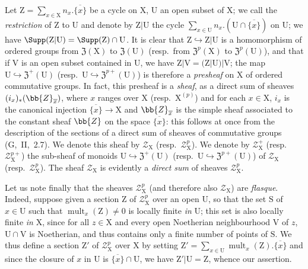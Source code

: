 \begin{env}[21.6.3]
\label{IV.21.6.3}
Let $\mathrm{Z}=\sum_{x\in\mathrm{X}}n_x.\overline{\{x\}}$ be a cycle on $\mathrm{X}$, $\mathrm{U}$ an open subset of $\mathrm{X}$;
we call the \emph{restriction} of $\mathrm{Z}$ to $\mathrm{U}$ and denote by $\mathrm{Z}|\mathrm{U}$ the cycle $\sum_{x\in\mathrm{U}}n_x.(\mathrm{U}\cap\overline{\{x\}})$ on $\mathrm{U}$;
we have $\Supp(\mathrm{Z}|\mathrm{U})=\Supp(\mathrm{Z})\cap\mathrm{U}$.
It is clear that $\mathrm{Z}\hookrightarrow\mathrm{Z}|\mathrm{U}$ is a homomorphism of ordered groups from $\mathfrak{Z}(\mathrm{X})$ to $\mathfrak{Z}(\mathrm{U})$ (resp.\ from $\mathfrak{Z}^p(\mathrm{X})$ to $\mathfrak{Z}^p(\mathrm{U})$), and that if $\mathrm{V}$ is an open subset contained in $\mathrm{U}$, we have $\mathrm{Z}|\mathrm{V}=(\mathrm{Z}|\mathrm{U})|\mathrm{V}$;
the map $\mathrm{U}\hookrightarrow\mathfrak{Z}^+(\mathrm{U})$ (resp.\ $\mathrm{U}\hookrightarrow\mathfrak{Z}^{p+}(\mathrm{U})$) is therefore a \emph{presheaf} on $\mathrm{X}$ of ordered commutative groups.
In fact, this presheaf is a \emph{sheaf}, as a direct sum of sheaves $(i_x)_*(\bb{Z}_{\overline{x}})$, where $x$ ranges over $\mathrm{X}$ (resp.\ $\mathrm{X}^{(p)}$) and for each $x\in\mathrm{X}$, $i_x$ is the canonical injection $\overline{\{x\}}\to\mathrm{X}$ and $\bb{Z}_{\overline{x}}$ is the simple sheaf associated to the constant sheaf $\bb{Z}$ on the space $\overline{\{x\}}$:
this follows at once from the description of the sections of a direct sum of sheaves of commutative groups (G,~II,~2.7).
We denote this sheaf by $\mathscr{Z}_\mathrm{X}$ (resp.\ $\mathscr{Z}_\mathrm{X}^p$).
We denote by $\mathscr{Z}_\mathrm{X}^+$ (resp.\ $\mathscr{Z}_\mathrm{X}^{p+}$) the sub-sheaf
of monoids $\mathrm{U}\hookrightarrow\mathfrak{Z}^+(\mathrm{U})$ (resp.\ $\mathrm{U}\hookrightarrow\mathfrak{Z}^{p+}(\mathrm{U})$) of $\mathscr{Z}_\mathrm{X}$ (resp.\ $\mathscr{Z}_\mathrm{X}^p$).
The sheaf $\mathscr{Z}_\mathrm{X}$ is evidently a \emph{direct sum} of sheaves $\mathscr{Z}_\mathrm{X}^p$.

Let us note finally that the sheaves $\mathscr{Z}_\mathrm{X}^p$ (and therefore also $\mathscr{Z}_\mathrm{X}$) are \emph{flasque}.
Indeed, suppose given a section $\mathrm{Z}$ of $\mathscr{Z}_\mathrm{X}^p$ over an open $\mathrm{U}$, so that the set $\mathrm{S}$ of $x\in\mathrm{U}$ such that $\operatorname{mult}_x(\mathrm{Z})\neq 0$ is locally finite \emph{in} $\mathrm{U}$;
this set is also locally finite \emph{in} $\mathrm{X}$, since for all $z\in\mathrm{X}$ and every open Noetherian neighbourhood $\mathrm{V}$ of $z$, $\mathrm{U}\cap\mathrm{V}$ is Noetherian, and thus contains only a finite number of points of $\mathrm{S}$.
We thus define a section $\mathrm{Z}'$ of $\mathscr{Z}_\mathrm{X}^p$ over $\mathrm{X}$ by setting $\mathrm{Z}'=\sum_{x\in\mathrm{U}}\operatorname{mult}_x(\mathrm{Z}).\overline{\{x\}}$ and since the closure of $x$ in $\mathrm{U}$ is $\overline{\{x\}}\cap\mathrm{U}$, we have $\mathrm{Z}'|\mathrm{U}=\mathrm{Z}$, whence our assertion.
\end{env}

